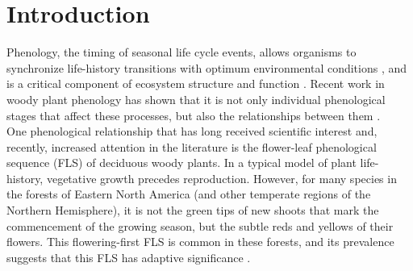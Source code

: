 \documentclass{article}
\begin{document}

\section*{Introduction}
Phenology, the timing of seasonal life cycle events, allows organisms to synchronize life-history transitions with optimum environmental conditions \citep{Forrest2010}, and is a critical component of ecosystem structure and function \citep{Cleland2007,Piao2007}. Recent work in woody plant phenology has shown that it is not only individual phenological stages that affect these processes, but also the relationships between them \citep{Ettinger2018}.\\

\noindent One phenological relationship that has long received scientific interest \citep[see][]{Robertson1895} and, recently, increased attention in the literature \citep{Savage2019, Gougherty2018} is the flower-leaf phenological sequence (FLS) of deciduous woody plants. In a typical model of plant life-history, vegetative growth precedes reproduction. However, for many species in the forests of Eastern North America (and other temperate regions of the Northern Hemisphere), it is not the green tips of new shoots that mark the commencement of the growing season, but the subtle reds and yellows of their flowers. This flowering-first FLS is common in these forests, and its prevalence suggests that this FLS has adaptive significance \citep{Rathcke_1985}.\\ 
\end{document}
